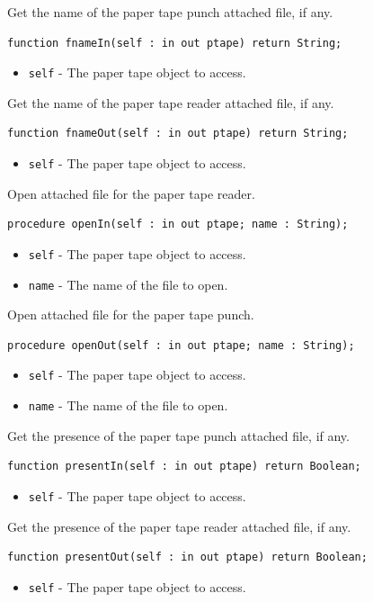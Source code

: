 \documentclass[10pt, openany]{book}
\newcommand{\keyword}[1]{\texttt{#1}}
\begin{document}
Get the name of the paper tape punch attached file, if any.
\begin{lstlisting}
function fnameIn(self : in out ptape) return String;
\end{lstlisting}
\begin{itemize}
  \item \keyword{self} - The paper tape object to access.
\end{itemize}

Get the name of the paper tape reader attached file, if any.
\begin{lstlisting}
function fnameOut(self : in out ptape) return String;
\end{lstlisting}
\begin{itemize}
  \item \keyword{self} - The paper tape object to access.
\end{itemize}

Open attached file for the paper tape reader.
\begin{lstlisting}
procedure openIn(self : in out ptape; name : String);
\end{lstlisting}
\begin{itemize}
  \item \keyword{self} - The paper tape object to access.
  \item \keyword{name} - The name of the file to open.
\end{itemize}

Open attached file for the paper tape punch.
\begin{lstlisting}
procedure openOut(self : in out ptape; name : String);
\end{lstlisting}
\begin{itemize}
  \item \keyword{self} - The paper tape object to access.
  \item \keyword{name} - The name of the file to open.
\end{itemize}


Get the presence of the paper tape punch attached file, if any.
\begin{lstlisting}
function presentIn(self : in out ptape) return Boolean;
\end{lstlisting}
\begin{itemize}
  \item \keyword{self} - The paper tape object to access.
\end{itemize}

Get the presence of the paper tape reader attached file, if any.
\begin{lstlisting}
function presentOut(self : in out ptape) return Boolean;
\end{lstlisting}
\begin{itemize}
  \item \keyword{self} - The paper tape object to access.
\end{itemize}
\end{document}
